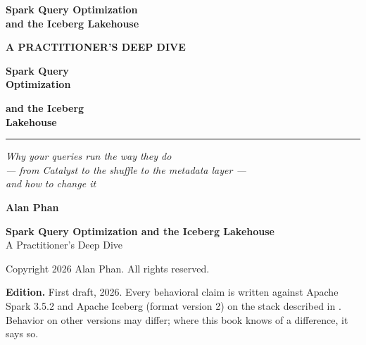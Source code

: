 \newpage
\thispagestyle{empty}
\begin{center}
\vspace*{0.3\textheight}
{\sffamily\fontsize{24pt}{28pt}\selectfont\bfseries Spark Query Optimization\\and the Iceberg Lakehouse\par}
\end{center}
\clearpage

\thispagestyle{empty}
\begin{center}
\vspace*{0.14\textheight}
{\sffamily\fontsize{11pt}{14pt}\selectfont\bfseries\color{bkAmber} A PRACTITIONER'S DEEP DIVE\par}
\vspace{1.2cm}
{\sffamily\fontsize{36pt}{40pt}\selectfont\bfseries\color{bkBlueInk} Spark Query\\Optimization\par}
\vspace{0.3cm}
{\sffamily\fontsize{22pt}{26pt}\selectfont\bfseries\color{bkBlue} and the Iceberg\\Lakehouse\par}
\vspace{1.0cm}
{\color{bkBlue}\rule{0.35\textwidth}{1.2pt}\par}
\vspace{1.0cm}
{\normalsize\itshape Why your queries run the way they do\\
--- from Catalyst to the shuffle to the metadata layer ---\\
and how to change it\par}
\vfill
{\sffamily\fontsize{18pt}{22pt}\selectfont\bfseries Alan Phan\par}
\vspace{1.5cm}
\end{center}
\clearpage

\thispagestyle{empty}
\vspace*{\fill}
\begingroup
\small\linespread{1.15}\selectfont
\setlength{\parindent}{0pt}\setlength{\parskip}{6pt}

\textbf{Spark Query Optimization and the Iceberg Lakehouse}\\
A Practitioner's Deep Dive

Copyright \textcopyright{} 2026 Alan Phan. All rights reserved.

\textbf{Edition.} First draft, 2026. Every behavioral claim is written against
Apache Spark 3.5.2 and Apache Iceberg (format version 2) on the stack described
in . Behavior on other versions may differ; where this book
knows of a difference, it says so.

